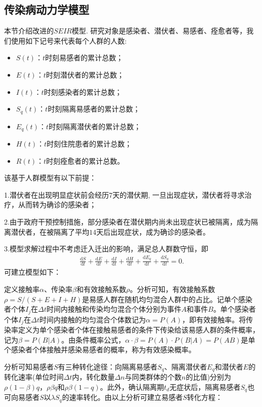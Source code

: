 \documentclass{whutmod}
\begin{document}
		\subsection{传染病动力学模型}
			本节介绍改进的$SEIR$模型. 研究对象是感染者、潜伏者、易感者、痊愈者等，我们使用如下记号来代表每个人群的人数:
			\begin{itemize}
				\item $S(t)$：$t$时刻易感者的累计总数；
				\item $E(t)$：$t$时刻潜伏者的累计总数；
				\item $I(t)$：$t$时刻感染者的累计总数；
				\item $S_q(t)$：$t$时刻隔离易感者的累计总数；
				\item $E_q(t)$：$t$时刻隔离潜伏者的累计总数；
				\item $H(t)$：$t$时刻住院患者的累计总数；
				\item $R(t)$：$t$时刻痊愈者的累计总数。
			\end{itemize}
		该基于人群模型有以下前提：
		
		1.潜伏者在出现明显症状前会经历$7$天的潜伏期, 一旦出现症状，潜伏者将寻求治疗，从而转为确诊的感染者；
		
		2.由于政府干预控制措施，部分感染者在潜伏期内尚未出现症状已被隔离，成为隔离潜伏者，在被隔离了平均$14$天后出现症状，成为确诊的感染者。
		
		3.模型求解过程中不考虑迁入迁出的影响，满足总人群数守恒，即
		\begin{gather*}
		\frac{\mathrm{d} S}{\mathrm{d} t}+\frac{\mathrm{d} E}{\mathrm{d} t}+\frac{\mathrm{d} I}{\mathrm{d} t}+\frac{\mathrm{d} H}{\mathrm{d} t}+\frac{\mathrm{d} E_q}{\mathrm{d} t}+\frac{\mathrm{d} S_q}{\mathrm{d} t}=0.
		\end{gather*}
		可建立模型如下：
		
		定义接触率$\alpha$、传染率$\beta$和有效接触系数$\rho$。分析可知，有效接触系数$\rho=S/(S+E+I+H)$是易感人群在随机均匀混合人群中的占比。记单个感染者个体$I_j$在$\Delta t$时间内接触和传染均匀混合个体分别为事件$A$和事件$B$。单个感染者个体$I_j$在$\Delta t$时间内接触的均匀混合个体数记为$\alpha=P(A)$，即有效接触率。将传染率定义为单个感染者个体在接触易感者的条件下传染给该易感人群的条件概率，记为$\beta=P(B|A)$。由条件概率公式，$\alpha \cdot \beta=P(A)\cdot P(B|A)=P(AB)$是单个感染者个体接触并感染易感者的概率，称为有效感染概率。
		
		分析可知易感者$S$有三种转化途径：向隔离易感者$S_q$、隔离潜伏者$E_q$和潜伏者$E$的转化速率(单位时间$\Delta t$内，转化数量$\Delta n$与同类群体的个数$n$的比值)分别为$\rho (1-\beta)q$，$ \rho \beta q$和$\rho \beta(1-q)$。此外，确认隔离期$t_d$无症状后，隔离易感者$S_q$也可向易感者$S$以$\lambda S_{q}$的速率转化。由以上分析可建立易感者$S$转化方程：
		
\end{document}
